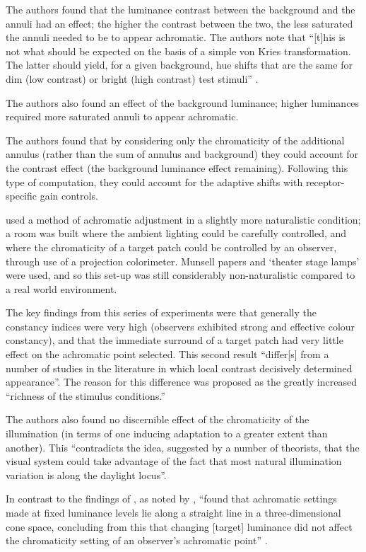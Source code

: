 The authors found that the luminance contrast between the background and the annuli had an effect; the higher the contrast between the two, the less saturated the annuli needed to be to appear achromatic. The authors note that ``[t]his is not what should be expected on the basis of a simple von Kries transformation. The latter should yield, for a given background, hue shifts that are the same for dim (low contrast) or bright (high contrast) test stimuli'' \citep{walraven_chromatic_1982}.

The authors also found an effect of the background luminance; higher luminances required more saturated annuli to appear achromatic. 

The authors found that by considering only the chromaticity of the additional annulus (rather than the sum of annulus and background) they could account for the contrast effect (the background luminance effect remaining). Following this type of computation, they could account for the adaptive shifts with receptor-specific gain controls.

\textbf{\citet{brainard_color_1998}} used a method of achromatic adjustment in a slightly more naturalistic condition; a room was built where the ambient lighting could be carefully controlled, and where the chromaticity of a target patch could be controlled by an observer, through use of a projection colorimeter. Munsell papers and `theater stage lamps' were used, and so this set-up was still considerably non-naturalistic compared to a real world environment.

The key findings from this series of experiments were that generally the constancy indices were very high (observers exhibited strong and effective colour constancy), and that the immediate surround of a target patch had very little effect on the achromatic point selected. This second result ``differ[s] from a number of studies in the literature in which local contrast decisively determined appearance''. The reason for this difference was proposed as the greatly increased ``richness of the stimulus conditions.''

The authors also found no discernible effect of the chromaticity of the illumination (in terms of one inducing adaptation to a greater extent than another). This ``contradicts the idea, suggested by a number of theorists, that the visual system could take advantage of the fact that most natural illumination variation is along the daylight locus''.

In contrast to the findings of \citet{werner_effect_1982}, as noted by \citet{aston_what_2017}, \citet{brainard_color_1998} ``found that achromatic settings made at fixed luminance levels lie along a straight line in a three-dimensional cone space, concluding from this that changing [target] luminance did not affect the chromaticity setting of an observer's achromatic point'' \citep{aston_what_2017}.


